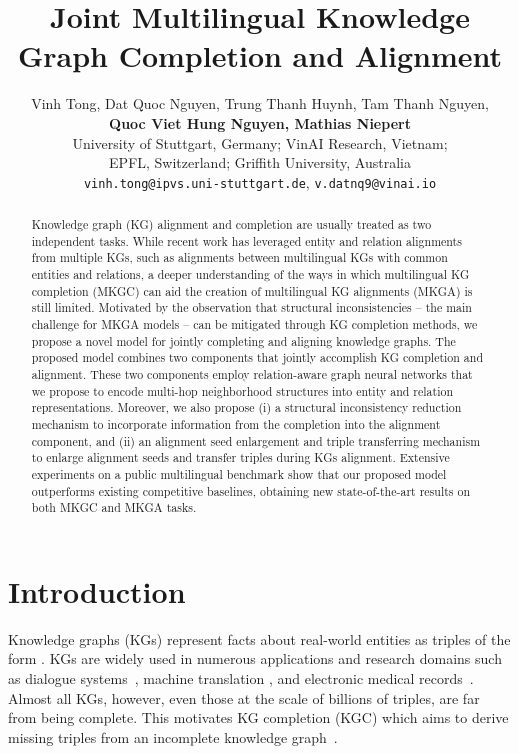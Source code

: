 \documentclass[11pt]{article}
\title{Joint Multilingual Knowledge Graph Completion and Alignment}
\author{Vinh Tong, Dat Quoc Nguyen, Trung Thanh Huynh, Tam Thanh Nguyen, \\ \textbf{Quoc Viet Hung Nguyen, Mathias Niepert}\\
  University of Stuttgart, Germany; VinAI Research, Vietnam; \\ EPFL, Switzerland;  Griffith University, Australia\\
   \texttt{vinh.tong@ipvs.uni-stuttgart.de}, \texttt{v.datnq9@vinai.io} }
\begin{document}
\maketitle

\begin{abstract}

Knowledge graph (KG) alignment and completion are usually treated as two independent tasks. While recent work has leveraged entity and relation alignments from multiple KGs, such as alignments between multilingual KGs with common entities and relations, a deeper understanding of the ways in which multilingual KG completion (MKGC) can aid the creation of multilingual KG alignments (MKGA) is still limited. Motivated by the observation that structural inconsistencies -- the main challenge for MKGA models -- can be mitigated through KG completion methods, we propose a novel model for jointly completing and aligning knowledge graphs. The proposed model combines two components that jointly accomplish KG completion and alignment. These two components employ relation-aware graph neural networks that we propose to encode multi-hop neighborhood structures into entity and relation representations. Moreover, we also propose (i) a structural inconsistency reduction mechanism to incorporate information from the completion into the alignment component, and (ii) an alignment seed enlargement and triple transferring mechanism to enlarge alignment seeds and transfer triples during KGs alignment. Extensive experiments on a public multilingual benchmark show that our proposed model outperforms existing competitive baselines, obtaining new state-of-the-art results on both MKGC and MKGA tasks.

\end{abstract}

\section{Introduction}


Knowledge graphs (KGs) represent facts about real-world entities as triples of the form . KGs are widely used in numerous applications and research domains such as dialogue systems~\cite{jung2020attnio}, machine translation \cite{zhao2020knowledge}, and electronic medical records~\cite{rotmensch2017learning}. Almost all KGs, however, even those at the scale of billions of triples, are far from being complete. This motivates KG completion (KGC) which aims to derive missing triples from an incomplete knowledge graph~\cite{bordes2013translating, wang2014knowledge,yang2014embedding, pmlr-v48-trouillon16, liu2017analogical,dettmers2018convolutional,Nguyen2020KGC,Ji_2021,tong2021two}. 
\end{document}
